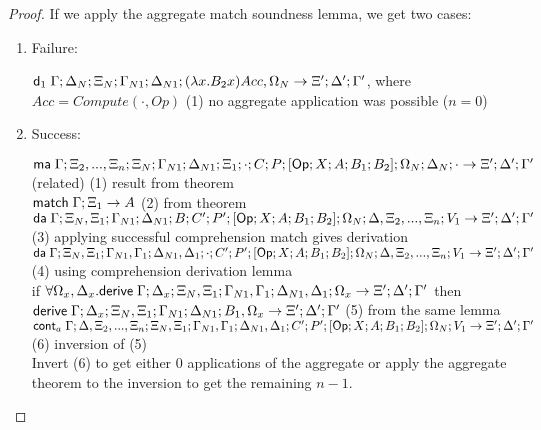 \begin{proof}
   If we apply the aggregate match soundness lemma, we get two cases:
   
   \begin{enumerate}
      \item Failure:
      
      $\mathsf{d}_1 \; \Gamma; \Delta_N; \Xi_N; \Gamma_{N1}; \Delta_{N1}; (\lambda x. B_2 x)Acc, \Omega_N \rightarrow \Xi'; \Delta'; \Gamma'$, where $Acc = Compute(\cdot, Op)$ \hfill (1) no aggregate application was possible ($n = 0$)\\
      
      \item Success:
      
      $\mathsf{ma} \; \Gamma; \Xi_2, ..., \Xi_n; \Xi_N; \Gamma_{N1}; \Delta_{N1}; \Xi_1; \cdot; C; P; [\mathsf{Op} ; X ; A ; B_1; B_2]; \Omega_N; \Delta_N; \cdot \rightarrow \Xi'; \Delta'; \Gamma'$ (related) \hfill (1) result from theorem \\
      $\mathsf{match} \; \Gamma; \Xi_1 \rightarrow A$ \hfill (2) from theorem \\
      $\mathsf{da} \; \Gamma; \Xi_N, \Xi_1; \Gamma_{N1}; \Delta_{N1}; B; C'; P'; [\mathsf{Op} ; X ; A ; B_1; B_2]; \Omega_N; \Delta, \Xi_2, ..., \Xi_n; V_1 \rightarrow \Xi'; \Delta'; \Gamma'$ \hfill (3) applying successful comprehension match gives derivation \\
      $\mathsf{da} \; \Gamma; \Xi_N, \Xi_1; \Gamma_{N1}, \Gamma_1; \Delta_{N1}, \Delta_1; \cdot; C'; P'; [\mathsf{Op} ; X ; A ; B_1; B_2]; \Omega_N; \Delta, \Xi_2, ..., \Xi_n; V_1 \rightarrow \Xi'; \Delta'; \Gamma'$ \hfill (4) using comprehension derivation lemma \\
      if $\forall \Omega_x, \Delta_x. \mathsf{derive} \; \Gamma; \Delta_x; \Xi_N, \Xi_1; \Gamma_{N1}, \Gamma_1; \Delta_{N1}, \Delta_1; \Omega_x \rightarrow \Xi'; \Delta'; \Gamma'$ then $\mathsf{derive} \; \Gamma; \Delta_x; \Xi_N, \Xi_1; \Gamma_{N1}; \Delta_{N1}; B_1, \Omega_x \rightarrow \Xi'; \Delta'; \Gamma'$ \hfill (5) from the same lemma \\
      $\mathsf{cont}_a \; \Gamma; \Delta, \Xi_2, ..., \Xi_n; \Xi_N, \Xi_1; \Gamma_{N1}, \Gamma_1; \Delta_{N1}, \Delta_1; C'; P'; [\mathsf{Op} ; X ; A ; B_1; B_2]; \Omega_N; V_1 \rightarrow \Xi'; \Delta'; \Gamma'$ \hfill (6) inversion of (5) \\
      
      Invert (6) to get either $0$ applications of the aggregate or apply the aggregate theorem to the inversion to get the remaining $n-1$. 
   \end{enumerate}
\end{proof}

